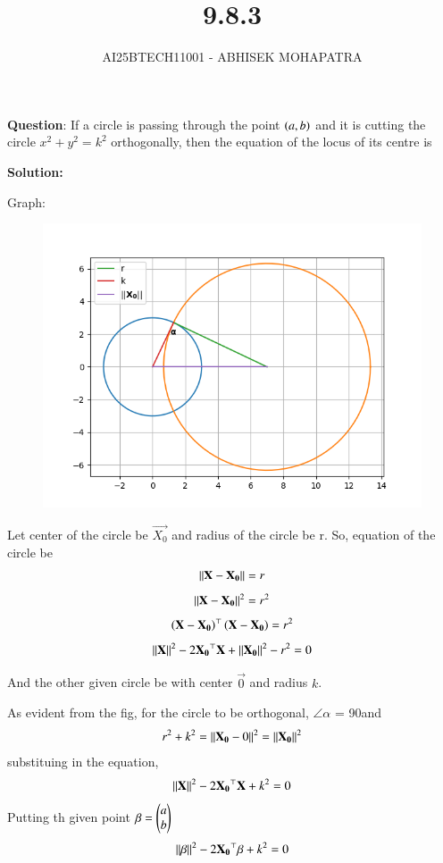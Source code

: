 \documentclass[journal,12pt,onecolumn]{IEEEtran}
\begin{document}
\title{9.8.3}
\author{AI25BTECH11001 - ABHISEK MOHAPATRA}
{\let\newpage\relax\maketitle}
	
	 	\textbf{Question}:
If a circle is passing through the point $\left(a, b\right)$ and it is cutting the circle $x^2 + y^2 = k^2$ orthogonally, then the equation of the locus of its centre is
		
		\textbf{Solution:}

	Graph:
\begin{figure}[h!]
	\centering
	\includegraphics[width=0.7\linewidth]{img.png}
\end{figure}

Let center of the circle be $\vec{X_0}$ and radius of the circle be r.
So, equation of the circle be
\begin{align}
		\left\lVert\mathbf{X}-\mathbf{X_0}\right\rVert = r
\end{align}
\begin{align}
		\left\lVert\mathbf{X}-\mathbf{X_0}\right\rVert^2 = r^2
\end{align}
\begin{align}
		\left(\mathbf{X}-\mathbf{X_0}\right)^\top\left(\mathbf{X}-\mathbf{X_0}\right) = r^2
\end{align}
\begin{align}
		\left\lVert\mathbf{X}\right\rVert^2-2\mathbf{X_0}^\top \mathbf{X}+\left\lVert\mathbf{X_0}\right\rVert^2-r^2 = 0
\end{align}

And the other given circle be with center $\vec{0}$ and radius $k$.

As evident from the fig, for the circle to be orthogonal, $\angle\alpha$ = 90\degree and
\begin{align}
		r^2 + k^2 = \left\lVert\mathbf{X_0} - 0\right\rVert^2= \left\lVert\mathbf{X_0}\right\rVert^2
\end{align}
substituing in the equation,
\begin{align}
		\left\lVert\mathbf{X}\right\rVert^2-2\mathbf{X_0}^\top \mathbf{X}+k^2 = 0
\end{align}
Putting th given point $\mathbf{\beta} = \begin{pmatrix}a\\b\end{pmatrix}$
\begin{align}
		\left\lVert\mathbf{\beta}\right\rVert^2-2\mathbf{X_0}^\top \mathbf{\beta}+k^2 = 0
\end{align}
\end{document}
